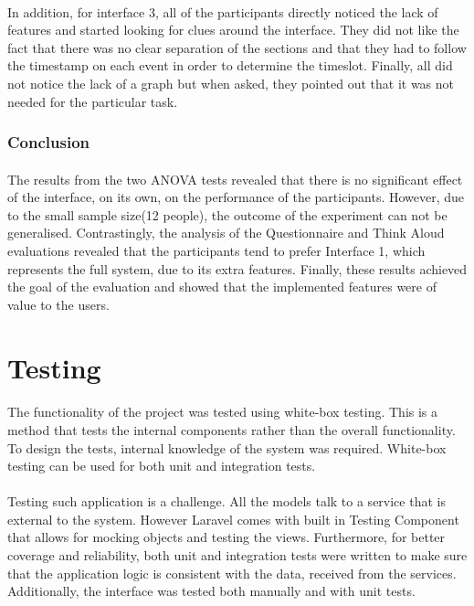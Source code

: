 \documentclass{l4proj}
\begin{document}
{\paragraph{}
In addition, for interface 3, all of the participants directly noticed the lack of features and started looking for clues around the interface. They did not like the fact that there was no clear separation of the sections and that they had to follow the timestamp on each event in order to determine the timeslot. Finally, all did not notice the lack of a graph but when asked, they pointed out that it was not needed for the particular task.

\subsubsection{Conclusion}
\paragraph{}
The results from the two ANOVA tests revealed that there is no significant effect of the interface, on its own, on the performance of the participants. However, due to the small sample size(12 people), the outcome of the experiment can not be generalised. Contrastingly, the analysis of the Questionnaire and Think Aloud evaluations revealed that the participants tend to prefer Interface 1, which represents the full system, due to its extra features. Finally, these results achieved the goal of the evaluation and showed that the implemented features were of value to the users.       

\section{Testing}
\paragraph{}
The functionality of the project was tested using white-box testing. This is a method that tests the internal components rather than the overall functionality. To design the tests, internal knowledge of the system was required. White-box testing can be used for both unit and integration tests.
\paragraph{}
Testing such application is a challenge. All the models talk to a service that is external to the system. However Laravel comes with built in Testing Component that allows for mocking objects and testing the views. Furthermore, for better coverage and reliability, both unit and integration tests were written to make sure that the application logic is consistent with the data, received from the services. Additionally, the interface was tested both manually and with unit tests. 

}
\end{document}
